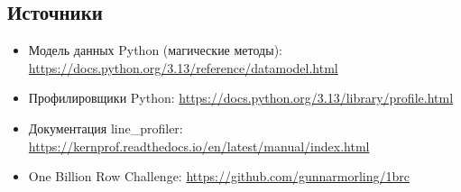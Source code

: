 \documentclass[11pt,a4paper]{article}
\begin{document}
\subsection*{Источники}
\begin{itemize}
  \item Модель данных Python (магические методы): \url{https://docs.python.org/3.13/reference/datamodel.html}
  \item Профилировщики Python: \url{https://docs.python.org/3.13/library/profile.html}
  \item Документация line\_profiler: \url{https://kernprof.readthedocs.io/en/latest/manual/index.html}
  \item One Billion Row Challenge: \url{https://github.com/gunnarmorling/1brc}
\end{itemize}
\end{document}
